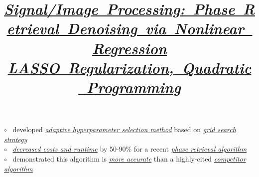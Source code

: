 \documentclass[12pt,margintitle,line]{res}
\begin{document}
\begin{resume}
\vspace{-0.5cm}
\title{
\href{https://github.com/Will-Wright/low-rank-opt-rapid-eig} {\mbox{\textsl{Signal/Image Processing: Phase Retrieval Denoising via Nonlinear Regression}}}
}
\employer{ 
}
\dates{}
\begin{position}
	
\vspace{-1.25cm}
$\circ$ \ developed 
\href{https://github.com/Will-Wright/low-rank-opt-rapid-eig/blob/master/adaptive_eigs_params.m}{\textit{adaptive hyperparameter selection method}}
based on 
\href{https://github.com/Will-Wright/low-rank-opt-rapid-eig#adaptive-parameter-selection-method-based-on-grid-search-results}{\textit{grid search strategy}}
	\\
$\circ$ \ \href{https://github.com/Will-Wright/low-rank-opt-rapid-eig#comparison-of-saga_sd-and-saga_sd-rapid-eig}{\textit{decreased costs and runtime}}
by 50-90\% for a recent
\href{https://arxiv.org/abs/1508.00315}{\textit{phase retrieval algorithm}}
	\\
$\circ$ \ demonstrated this algorithm is 
\href{https://github.com/Will-Wright/low-rank-opt-rapid-eig#comparison-of-saga_sd-and-wflow-for-noisy-phase-retrieval}{\textit{more accurate}}
than a highly-cited \href{https://arxiv.org/abs/1407.1065}{\textit{competitor algorithm}}
\end{position}





\vspace{-0.5cm}
\title{
\href{https://github.com/Will-Wright/lasso-quadratic-solver} {\mbox{\textsl{LASSO Regularization, Quadratic Programming}}}
}
\employer{ 
}
\dates{}
\begin{position}
	
	\begin{figure} 
		\vspace{-1.40cm}
		\hspace{-3.70cm}
 	 	\begin{minipage}[t]{3cm}
  		\end{minipage} 
	\end{figure} 	
	

\end{position}
\end{resume}
\end{document}
